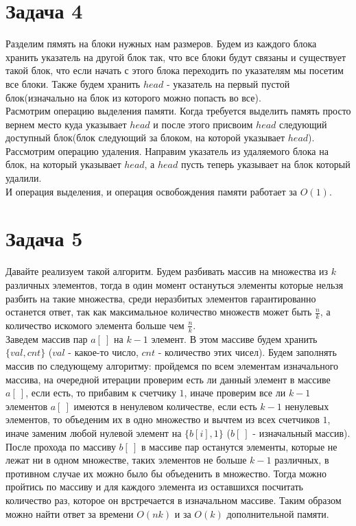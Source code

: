 \documentclass{article}
\begin{document}
	\section*{Задача 4}
	Разделим пямять на блоки нужных нам размеров. Будем из каждого блока хранить указатель на другой блок так, что все блоки будут связаны и существует такой блок, что если начать с этого блока переходить по указателям мы посетим все блоки. Также будем хранить $head$ - указатель на первый пустой блок(изначально на блок из которого можно попасть во все).
	\\
	Расмотрим операцию выделения памяти. Когда требуется выделить память просто вернем место куда указывает $head$ и после этого присвоим $head$ следующий доступный блок(блок следующий за блоком, на которой указывает $head$).
	\\
	Рассмотрим операцию удаления. Направим указатель из удаляемого блока на блок, на который указывает $head$, а $head$ пусть теперь указывает на блок который удалили.
	\\
	И операция выделения, и операция освобождения памяти работает за $O(1)$.
	
	\section*{Задача 5}
	Давайте реализуем такой алгоритм. Будем разбивать массив на множества из $k$ различных элементов, тогда в один момент остануться элементы которые нельзя разбить на такие множества, среди неразбитых элементов гарантированно останется ответ, так как максимальное количество множеств может быть $\frac{n}{k}$, а количество искомого элемента больше чем $\frac{n}{k}$. 
	\\
	Заведем массив пар $a[\ ]$ на $k - 1$ элемент. В этом массиве будем хранить $\{val, cnt\}$ ($val$ - какое-то число, $cnt$ - количество этих чисел). Будем заполнять массив по следующему алгоритму: пройдемся по всем элементам изначального массива, на очередной итерации проверим есть ли данный элемент в массиве $a[\ ]$, если есть, то прибавим к счетчику $1$, иначе проверим все ли $k - 1$ элементов $a[\ ]$ имеются в ненулевом количестве, если есть $k - 1$ ненулевых элементов, то объеденим их в одно множество и вычтем из всех счетчиков $1$, иначе заменим любой нулевой элемент на $\{b[i], 1\}$ ($b[\ ]$ - изначальный массив).
	\\
	После прохода по массиву $b[\ ]$ в массиве пар останутся элементы, которые не лежат ни в одном множестве, таких элементов не больше $k - 1$ различных, в противном случае их можно было бы объеденить в множество. Тогда можно пройтись по массиву и для каждого элемента из оставшихся посчитать количество раз, которое он врстречается в изначальном массиве. Таким образом можно найти ответ за времени $O(nk)$ и за $O(k)$ дополнительной памяти.
	\\
	\\
	
\end{document}
